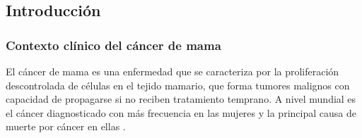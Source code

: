 
\subsection{Introducción}
\label{sec:introduccion}

\subsubsection{Contexto clínico del cáncer de mama}

El cáncer de mama es una enfermedad que se caracteriza por la proliferación descontrolada de células en el
tejido mamario, que forma tumores malignos con capacidad de propagarse si no reciben tratamiento
temprano. A nivel mundial es el cáncer diagnosticado con más frecuencia en las mujeres y la principal
causa de muerte por cáncer en ellas \cite{Bray2024GLOBOCAN}.

